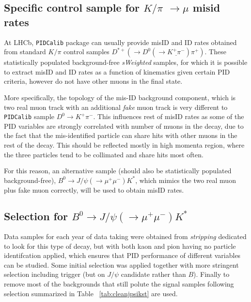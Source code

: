 \subsection{Specific control sample for $K/\pi$ $\rightarrow \mu$ misid rates}
\label{extraction}
At LHCb, \texttt{PIDCalib} package can usually provide misID and ID rates obtained from standard $K/\pi$ control samples $D^{*+}(\rightarrow D^{0}(\rightarrow \underline{K^{+} \pi^{-}}) \pi^{+})$. These statistically populated background-free \textit{sWeighted} samples, for which it is possible to extract misID and ID rates as a function of kinematics given certain \gls{PID} criteria, however do not have other muons in the final state. 

More specifically, the topology of the mis-ID background component, which is two real muon track with an additional \textit{fake} muon track is very different to \texttt{PIDCalib} sample $D^{0} \rightarrow K^{+} \pi^{-}$. This influences rest of misID rates as some of the \gls{PID} variables are strongly correlated with number of muons in the decay, due to the fact that the mis-identified particle can share hits with other muons in the rest of the decay. This should be reflected mostly in high momenta region, where the three particles tend to be collimated and share hits most often.

For this reason, an alternative sample (should also be statistically populated background-free), $B^{0} \rightarrow J/\psi(\rightarrow \mu^{+} \mu^{-}) K^{*}$, which mimics the two real muon plus fake muon correctly, will be used to obtain misID rates.

\subsection{Selection for $B^{0} \rightarrow J/\psi(\rightarrow \mu^{+} \mu^{-}) K^{*}$ }
Data samples for each year of data taking were obtained from \textit{stripping} dedicated to look for this type of decay, but with both kaon and pion having no particle identifcation applied, which ensures that \gls{PID} performance of different variables can be studied. Some initial selection was applied together with more stringent \Bmumumu selection including trigger (but on $J/\psi$ candidate rather than $B$). Finally to remove most of the backgrounds that still polute the signal samples following selection summarized in Table ~\ref{tab:cleanjpsikst} are used.



